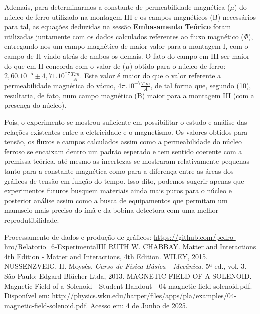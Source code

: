 \documentclass[column,brazilian,12pt,a4paper,final]{article}
\begin{document}
Ademais, para determinarmos a constante de permeabilidade magnética ($\mu$)
do núcleo de ferro utilizado na montagem III e os campos magnéticos (B) necessários para tal, as equações deduzidas na sessão \textbf{Embasamento Teórico} foram utilizadas juntamente com os dados calculados referentes ao fluxo magnético ($\Phi$), entregando-nos um campo magnético de maior valor para a montagem I, com o campo de II vindo atrás de ambos os demais. O fato do campo em III ser maior do que em II concorda com o valor de ($\mu$) obtido para o núcleo de ferro: $2,60.10^{-5} \pm 4,71.10^{^-7} \frac{T.m}{A}$. Este valor é maior do que o valor referente a permeabilidade magnética do vácuo, $4\pi.10^{-7}\frac{T.m}{A}$, de tal forma que, segundo (10), resultaria, de fato, num campo magnético (B) maior para a montagem III (com a presença do núcleo). 

Pois, o experimento se mostrou suficiente em possibilitar o estudo e análise das relações existentes entre a eletricidade e o magnetismo. Os valores obtidos para tensão, os fluxos e campos calculados assim como a permeabilidade do núcleo ferroso se encaixam dentro um padrão esperado e tem sentido coerente com a premissa teórica, até mesmo as incertezas se mostraram relativamente pequenas tanto para a constante magnética como para a diferença entre as áreas dos gráficos de tensão em função do tempo. Isso dito, podemos sugerir apenas que experimentos futuros busquem materiais ainda mais puros para o núcleo e posterior análise assim como a busca de equipamentos que permitam um manuseio mais preciso do ímã e da bobina detectora com uma melhor reprodutibilidade.


\begin{thebibliography}{99}

\bibitem{}
Processamento de dados e produção de gráficos:
\url{https://github.com/pedro-hro/Relatorio_6-ExperimentalIII}
\bibitem{}
RUTH W. CHABBAY. Matter and Interactions 4th Edition - Matter and Interactions, 4th Edition. WILEY, 2015.
\bibitem{}
NUSSENZVEIG, H. Moysés. {\em Curso de Física Básica - Mecânica}. 5ª ed., vol. 3. São Paulo: Edgard Blücher Ltda, 2013.
\bibitem{}
MAGNETIC FIELD OF A SOLENOID. Magnetic Field of a Solenoid -
        Student Handout - 04-magnetic-field-solenoid.pdf.
        Disponível em: \url{http://physics.wku.edu/harper/files/apps/pla/examples/04-magnetic-field-solenoid.pdf}. Acesso em: 4 de Junho de 2025.

\end{thebibliography}


\end{document}
